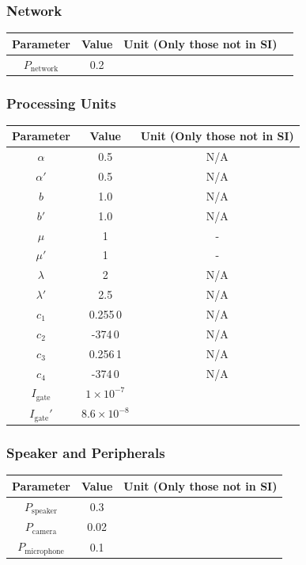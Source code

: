 \documentclass[12pt]{article}
\begin{document}
\subsubsection{Network}

\begin{center}
\begin{tabular}{c|ccc}
	\hline
	Parameter & Value & Unit (Only those not in SI) \\
	\hline
	$P_\mathrm{network}$ & 0.2 & \\
	\hline
\end{tabular}
\end{center}

\subsubsection{Processing Units}

\begin{center}
\begin{tabular}{c|cc}
	\hline
	Parameter & Value & Unit (Only those not in SI) \\
	\hline
	$\alpha$ & 0.5 & N/A \\
	$\alpha'$ & 0.5 & N/A \\
	$b$ & 1.0 & N/A \\
	$b'$ & 1.0 & N/A \\
	$\mu$ & 1 & - \\
	$\mu'$ & 1 & - \\
	$\lambda$ & 2 & N/A \\
	$\lambda'$ & 2.5 & N/A \\
	$c_1$ & 0.255\,0 & N/A \\
	$c_2$ & -374\,0 & N/A \\
	$c_3$ & 0.256\,1 & N/A \\
	$c_4$ & -374\,0 & N/A \\
	$I_\mathrm{gate}$ & $1\times 10^{-7}$ &  \\
	$I_\mathrm{gate}'$ & $8.6\times 10^{-8}$ &  \\
	\hline
\end{tabular}
\end{center}

\subsubsection{Speaker and Peripherals}

\begin{center}
\begin{tabular}{c|cc}
	\hline
	Parameter & Value & Unit (Only those not in SI) \\
	\hline
	$P_\mathrm{speaker}$ & 0.3 & \\
	$P_\mathrm{camera}$ & 0.02 & \\
	$P_\mathrm{microphone}$ & 0.1 & \\
	\hline
\end{tabular}
\end{center}
\end{document}
